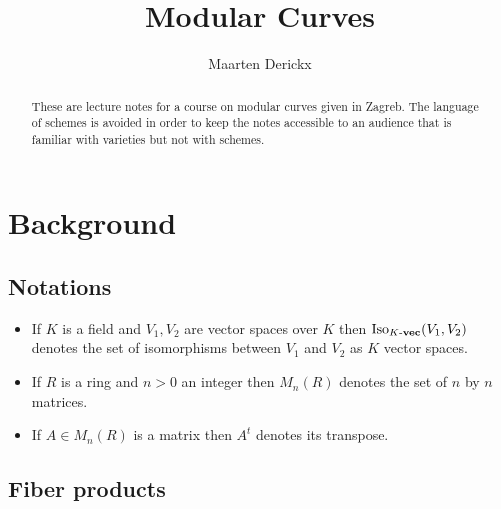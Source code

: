 \documentclass[a4paper,12pt,reqno]{amsart}
\title{Modular Curves}
\author{Maarten Derickx}
\newcommand{\IsoKVec}[1]{\mathrm{Iso}_{#1 {\bf\text{-}vec}}}
\newcommand{\transpose}{t}
\theoremstyle{definition}
\numberwithin{lemma}{section}
\numberwithin{equation}{section}
\numberwithin{figure}{section}
\begin{document}
\begin{abstract}
These are lecture notes for a course on modular curves given in Zagreb. The language of schemes is avoided in order to keep the notes accessible to an audience that is familiar with varieties but not with schemes.
\end{abstract}

\maketitle
\setcounter{tocdepth}{3}
\tableofcontents

\section{Background}

\subsection{Notations}

\begin{itemize}
	\item If $K$ is a field and $V_1,V_2$ are vector spaces over $K$ then $\IsoKVec{K}(V_1,V_2)$ denotes the set of isomorphisms between $V_1$ and $V_2$ as $K$ vector spaces.
	\item If $R$ is a ring and $n >0 $ an integer then $M_n(R)$ denotes the set of $n$ by $n$ matrices.
	\item If $A \in M_n(R)$ is a matrix then $A^\transpose$ denotes its transpose. 
\end{itemize}

\newpage
\subsection{Fiber products}
\end{document}
